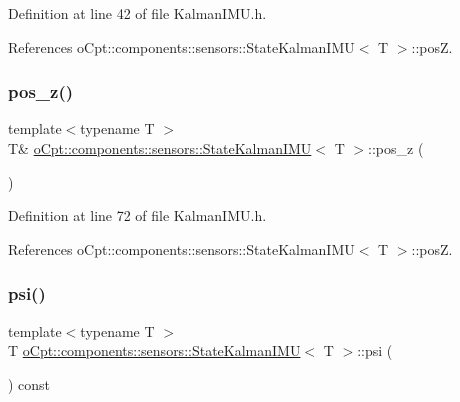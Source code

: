 Definition at line 42 of file Kalman\+I\+M\+U.\+h.



References o\+Cpt\+::components\+::sensors\+::\+State\+Kalman\+I\+M\+U$<$ T $>$\+::posZ.

\hypertarget{classo_cpt_1_1components_1_1sensors_1_1_state_kalman_i_m_u_a26f78df972c9150a4b95dff4d64d746e}{}\label{classo_cpt_1_1components_1_1sensors_1_1_state_kalman_i_m_u_a26f78df972c9150a4b95dff4d64d746e} 
\subsubsection{\texorpdfstring{pos\+\_\+z()}{pos\_z()}\hspace{0.1cm}{\footnotesize\ttfamily [2/2]}}
{\footnotesize\ttfamily template$<$typename T $>$ \\
T\& \hyperlink{classo_cpt_1_1components_1_1sensors_1_1_state_kalman_i_m_u}{o\+Cpt\+::components\+::sensors\+::\+State\+Kalman\+I\+MU}$<$ T $>$\+::pos\+\_\+z (\begin{DoxyParamCaption}{ }\end{DoxyParamCaption})\hspace{0.3cm}{\ttfamily [inline]}}



Definition at line 72 of file Kalman\+I\+M\+U.\+h.



References o\+Cpt\+::components\+::sensors\+::\+State\+Kalman\+I\+M\+U$<$ T $>$\+::posZ.

\hypertarget{classo_cpt_1_1components_1_1sensors_1_1_state_kalman_i_m_u_a4d11449f57cc20aa89f310e80660401a}{}\label{classo_cpt_1_1components_1_1sensors_1_1_state_kalman_i_m_u_a4d11449f57cc20aa89f310e80660401a} 
\subsubsection{\texorpdfstring{psi()}{psi()}\hspace{0.1cm}{\footnotesize\ttfamily [1/2]}}
{\footnotesize\ttfamily template$<$typename T $>$ \\
T \hyperlink{classo_cpt_1_1components_1_1sensors_1_1_state_kalman_i_m_u}{o\+Cpt\+::components\+::sensors\+::\+State\+Kalman\+I\+MU}$<$ T $>$\+::psi (\begin{DoxyParamCaption}{ }\end{DoxyParamCaption}) const\hspace{0.3cm}{\ttfamily [inline]}}



